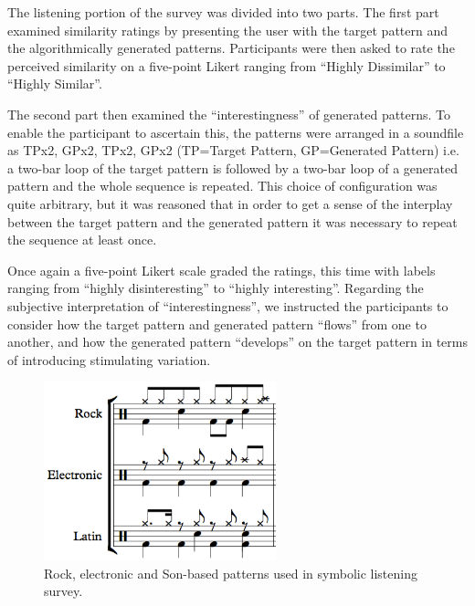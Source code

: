 The listening portion of the survey was divided into two parts. The first part examined similarity ratings by presenting the user with the target pattern and the algorithmically generated patterns. Participants were then asked to rate the perceived similarity on a five-point Likert ranging from “Highly Dissimilar” to “Highly Similar”.

The second part then examined the “interestingness” of generated patterns. To enable the participant to ascertain this, the  patterns were arranged in a soundfile as TPx2, GPx2, TPx2, GPx2 (TP=Target Pattern, GP=Generated Pattern) i.e. a two-bar loop of the target pattern is followed by a two-bar loop of a generated pattern and the whole sequence is repeated. This choice of configuration was quite arbitrary, but it was reasoned that in order to get a sense of the interplay between the target pattern and the generated pattern it was necessary to repeat the sequence at least once.

Once again a five-point Likert scale graded the ratings, this time with labels ranging from ``highly disinteresting'' to ``highly interesting''. Regarding the subjective interpretation of ``interestingness'', we instructed the participants to consider how the target pattern and generated pattern ``flows'' from one to another, and how the generated pattern ``develops'' on the target pattern in terms of introducing stimulating variation.

\begin{figure}
	\begin{center}
		\includegraphics[width=0.6\textwidth]{ch03_symbolic/figures/patterns.png}
	\end{center}
	\caption[Rock, electronic and Son-based patterns used in symbolic listening survey]{Rock, electronic and Son-based patterns used in symbolic listening survey.}
	\label{fig:symbolic_patterns}
\end{figure}

